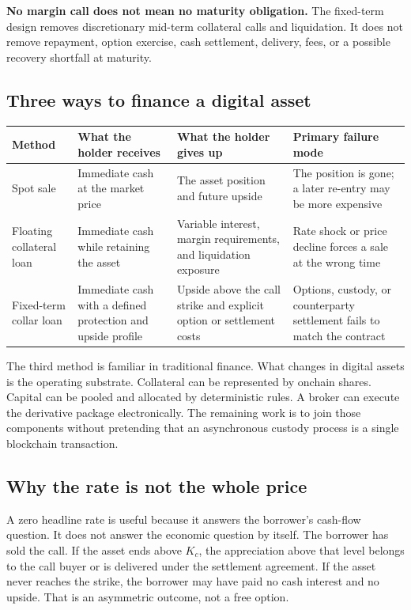 \documentclass[11pt,oneside]{article}
\begin{document}
\begin{riskbox}
\textbf{No margin call does not mean no maturity obligation.} The fixed-term
design removes discretionary mid-term collateral calls and liquidation. It
does not remove repayment, option exercise, cash settlement, delivery, fees,
or a possible recovery shortfall at maturity.
\end{riskbox}

\subsection{Three ways to finance a digital asset}

\begin{center}
\begin{tabularx}{\textwidth}{@{}p{}YYY@{}}
\toprule
\textbf{Method} & \textbf{What the holder receives} & \textbf{What the holder gives up} & \textbf{Primary failure mode} \\
\midrule
Spot sale & Immediate cash at the market price & The asset position and future upside & The position is gone; a later re-entry may be more expensive \\
Floating collateral loan & Immediate cash while retaining the asset & Variable interest, margin requirements, and liquidation exposure & Rate shock or price decline forces a sale at the wrong time \\
Fixed-term collar loan & Immediate cash with a defined protection and upside profile & Upside above the call strike and explicit option or settlement costs & Options, custody, or counterparty settlement fails to match the contract \\
\bottomrule
\end{tabularx}
\end{center}

The third method is familiar in traditional finance. What changes in digital assets is the operating substrate. Collateral can be represented by onchain shares. Capital can be pooled and allocated by deterministic rules. A broker can execute the derivative package electronically. The remaining work is to join those components without pretending that an asynchronous custody process is a single blockchain transaction.

\subsection{Why the rate is not the whole price}

A zero headline rate is useful because it answers the borrower's cash-flow question. It does not answer the economic question by itself. The borrower has sold the call. If the asset ends above $K_c$, the appreciation above that level belongs to the call buyer or is delivered under the settlement agreement. If the asset never reaches the strike, the borrower may have paid no cash interest and no upside. That is an asymmetric outcome, not a free option.
\end{document}
